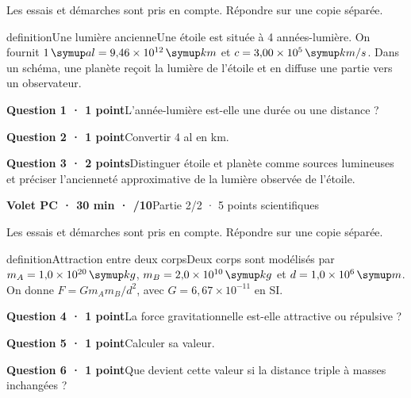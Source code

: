 \par\vspace{2mm}Les essais et démarches sont pris en compte. Répondre sur une copie séparée.\par
\begin{pcEncadre}{definition}{Une lumière ancienne}Une étoile est située à 4 années-lumière. On fournit $1\unite{al}=9{,}46\times10^{12}\unite{km}$ et $c=3{,}00\times10^5\unite{km/s}$. Dans un schéma, une planète reçoit la lumière de l’étoile et en diffuse une partie vers un observateur.\end{pcEncadre}
\par\addvspace{3mm}\noindent\textbf{Question 1 · 1 point}\quad L’année-lumière est-elle une durée ou une distance ?\par
\par\addvspace{3mm}\noindent\textbf{Question 2 · 1 point}\quad Convertir 4 al en km.\par
\par\addvspace{3mm}\noindent\textbf{Question 3 · 2 points}\quad Distinguer étoile et planète comme sources lumineuses et préciser l’ancienneté approximative de la lumière observée de l’étoile.\par
\vfill{}
\noindent\textbf{Volet PC · 30 min · /10}\hfill Partie 2/2 · 5 points scientifiques
\par\vspace{2mm}Les essais et démarches sont pris en compte. Répondre sur une copie séparée.\par
\begin{pcEncadre}{definition}{Attraction entre deux corps}Deux corps sont modélisés par $m_A=1{,}0\times10^{20}\unite{kg}$, $m_B=2{,}0\times10^{10}\unite{kg}$ et $d=1{,}0\times10^6\unite m$. On donne $F=Gm_A m_B/d^2$, avec $G=6{,}67\times10^{-11}$ en SI.\end{pcEncadre}
\par\addvspace{3mm}\noindent\textbf{Question 4 · 1 point}\quad La force gravitationnelle est-elle attractive ou répulsive ?\par
\par\addvspace{3mm}\noindent\textbf{Question 5 · 1 point}\quad Calculer sa valeur.\par
\par\addvspace{3mm}\noindent\textbf{Question 6 · 1 point}\quad Que devient cette valeur si la distance triple à masses inchangées ?\par
